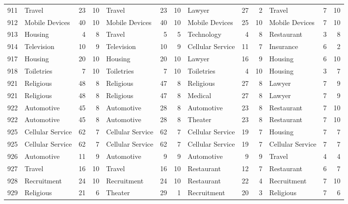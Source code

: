 \begin{figure}[htbp]
\begin{tabular}{rlrrlrrlrrlrr}
    911   & Travel & 23    & 10    & Travel & 23    & 10    & Lawyer & 27    & 2     & Travel & 7     & 10 \\
    912   & Mobile Devices & 40    & 10    & Mobile Devices & 40    & 10    & Mobile Devices & 25    & 10    & Mobile Devices & 7     & 10 \\
    913   & Housing & 4     & 8     & Travel & 5     & 5     & Technology & 4     & 8     & Restaurant & 3     & 8 \\
    914   & Television & 10    & 9     & Television & 10    & 9     & Cellular Service & 11    & 7     & Insurance & 6     & 2 \\
    917   & Housing & 20    & 10    & Housing & 20    & 10    & Lawyer & 16    & 9     & Housing & 6     & 10 \\
    918   & Toiletries & 7     & 10    & Toiletries & 7     & 10    & Toiletries & 4     & 10    & Housing & 3     & 7 \\
    921   & Religious & 48    & 8     & Religious & 47    & 8     & Religious & 27    & 8     & Lawyer & 7     & 9 \\
    921   & Religious & 48    & 8     & Religious & 47    & 8     & Medical & 27    & 8     & Lawyer & 7     & 9 \\
    922   & Automotive & 45    & 8     & Automotive & 28    & 8     & Automotive & 23    & 8     & Restaurant & 7     & 10 \\
    922   & Automotive & 45    & 8     & Automotive & 28    & 8     & Theater & 23    & 8     & Restaurant & 7     & 10 \\
    925   & Cellular Service & 62    & 7     & Cellular Service & 62    & 7     & Cellular Service & 19    & 7     & Housing & 7     & 7 \\
    925   & Cellular Service & 62    & 7     & Cellular Service & 62    & 7     & Cellular Service & 19    & 7     & Cellular Service & 7     & 7 \\
    926   & Automotive & 11    & 9     & Automotive & 9     & 9     & Automotive & 9     & 9     & Travel & 4     & 4 \\
    927   & Travel & 16    & 10    & Travel & 16    & 10    & Restaurant & 12    & 7     & Restaurant & 6     & 7 \\
    928   & Recruitment & 24    & 10    & Recruitment & 24    & 10    & Restaurant & 22    & 4     & Recruitment & 7     & 10 \\
    929   & Religious & 21    & 6     & Theater & 29    & 1     & Recruitment & 20    & 3     & Religious & 7     & 6 \\

\end{tabular}
\end{figure}
